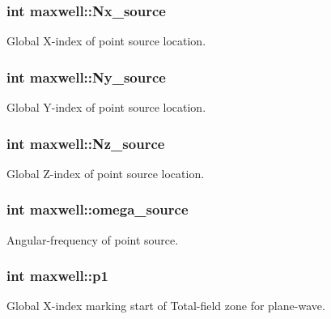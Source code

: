 \subsubsection[{\texorpdfstring{Nx\+\_\+source}{Nx_source}}]{\setlength{\rightskip}{0pt plus 5cm}int maxwell\+::\+Nx\+\_\+source}\hypertarget{classmaxwell_afb46767f44dd0c6628b46ae2a3d7d5f3}{}\label{classmaxwell_afb46767f44dd0c6628b46ae2a3d7d5f3}
Global X-\/index of point source location. 
\subsubsection[{\texorpdfstring{Ny\+\_\+source}{Ny_source}}]{\setlength{\rightskip}{0pt plus 5cm}int maxwell\+::\+Ny\+\_\+source}\hypertarget{classmaxwell_a5e7719b20906c564538f8439fc379493}{}\label{classmaxwell_a5e7719b20906c564538f8439fc379493}
Global Y-\/index of point source location. 
\subsubsection[{\texorpdfstring{Nz\+\_\+source}{Nz_source}}]{\setlength{\rightskip}{0pt plus 5cm}int maxwell\+::\+Nz\+\_\+source}\hypertarget{classmaxwell_adc2e00e20142a6f908ad97be1b8250ab}{}\label{classmaxwell_adc2e00e20142a6f908ad97be1b8250ab}
Global Z-\/index of point source location. 
\subsubsection[{\texorpdfstring{omega\+\_\+source}{omega_source}}]{\setlength{\rightskip}{0pt plus 5cm}int maxwell\+::omega\+\_\+source}\hypertarget{classmaxwell_a407b67012a9db173bcc97a0387ad3804}{}\label{classmaxwell_a407b67012a9db173bcc97a0387ad3804}
Angular-\/frequency of point source. 
\subsubsection[{\texorpdfstring{p1}{p1}}]{\setlength{\rightskip}{0pt plus 5cm}int maxwell\+::p1}\hypertarget{classmaxwell_ae44e53ed3db3e794c86b1ee2ed45e618}{}\label{classmaxwell_ae44e53ed3db3e794c86b1ee2ed45e618}
Global X-\/index marking start of Total-\/field zone for plane-\/wave. 
